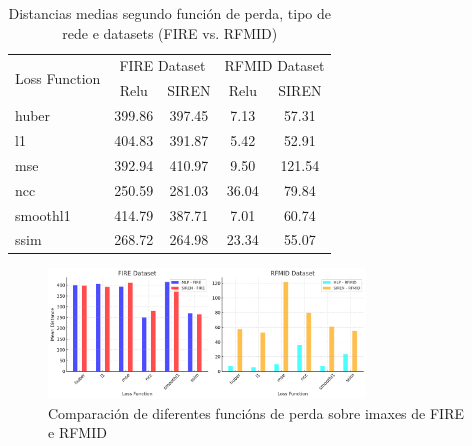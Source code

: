 

\begin{table}[ht]
    \centering
    \begin{tabular}{|l|cc|cc|}
    \hline
    \multirow{2}{*}{Loss Function} & \multicolumn{2}{c|}{FIRE Dataset} & \multicolumn{2}{c|}{RFMID Dataset} \\ \cline{2-5}
     & Relu & SIREN & Relu & SIREN \\ \hline
    huber & 399.86 & 397.45 & 7.13 & 57.31 \\ \hline
    l1 & 404.83 & 391.87 & 5.42 & 52.91 \\ \hline
    mse & 392.94 & 410.97 & 9.50 & 121.54 \\ \hline
    ncc & 250.59 & 281.03 & 36.04 & 79.84 \\ \hline
    smoothl1 & 414.79 & 387.71 & 7.01 & 60.74 \\ \hline
    ssim & 268.72 & 264.98 & 23.34 & 55.07 \\ \hline
    \end{tabular}
    \caption{Distancias medias segundo función de perda, tipo de rede e datasets (FIRE vs. RFMID)}
    \label{tab:mean_distances}
\end{table}

\begin{figure}[ht]
    \centering
    \includegraphics[width=0.75\textwidth]{imaxes/losstype.png}
    \caption{Comparación de diferentes funcións de perda sobre imaxes de FIRE e RFMID}
    \label{fig:loss_functions_comparison}
\end{figure}
    


